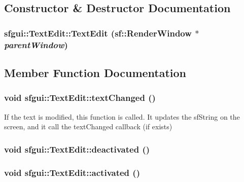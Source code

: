 \subsection{Constructor \& Destructor Documentation}
\hypertarget{classsfgui_1_1TextEdit_c6f2d938ccf876f05a9a9c47060c6093}{
\subsubsection[TextEdit]{\setlength{\rightskip}{0pt plus 5cm}sfgui::TextEdit::TextEdit (sf::RenderWindow $\ast$ {\em parentWindow})}}
\label{classsfgui_1_1TextEdit_c6f2d938ccf876f05a9a9c47060c6093}




\subsection{Member Function Documentation}
\hypertarget{classsfgui_1_1TextEdit_04bf790d96e0014479cc791691ecbade}{
\subsubsection[textChanged]{\setlength{\rightskip}{0pt plus 5cm}void sfgui::TextEdit::textChanged ()}}
\label{classsfgui_1_1TextEdit_04bf790d96e0014479cc791691ecbade}




If the text is modified, this function is called. It updates the sfString on the screen, and it call the textChanged callback (if exists) \hypertarget{classsfgui_1_1TextEdit_c5ff761e3933294b46892db32e62b9f6}{
\subsubsection[deactivated]{\setlength{\rightskip}{0pt plus 5cm}void sfgui::TextEdit::deactivated ()}}
\label{classsfgui_1_1TextEdit_c5ff761e3933294b46892db32e62b9f6}


\hypertarget{classsfgui_1_1TextEdit_c009c601675801f2039d8f526e6fc921}{
\subsubsection[activated]{\setlength{\rightskip}{0pt plus 5cm}void sfgui::TextEdit::activated ()}}
\label{classsfgui_1_1TextEdit_c009c601675801f2039d8f526e6fc921}



